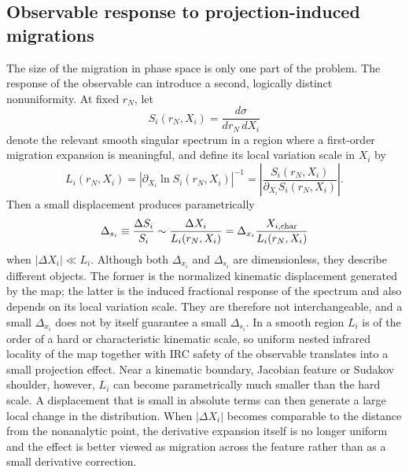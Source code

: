 \documentclass[11pt]{article}
\newcommand{\rn}{r_N}
\begin{document}
\subsection{Observable response to projection-induced migrations}
\label{subsec:observable-response-projection}

The size of the migration in phase space is only one part of the problem. The response of the observable can
introduce a second, logically distinct nonuniformity. At fixed $\rn$, let
\begin{equation}
S_i(\rn,X_i)=\frac{d\sigma}{d\rn\,dX_i}
\label{eq:observable-spectrum-S}
\end{equation}
denote the relevant smooth singular spectrum in a region where a first-order migration expansion is meaningful,
and define its local variation scale in $X_i$ by
\begin{equation}
L_i(\rn,X_i)
=
\left|
\partial_{X_i}\ln S_i(\rn,X_i)
\right|^{-1}
=
\left|
\frac{S_i(\rn,X_i)}{\partial_{X_i}S_i(\rn,X_i)}
\right|.
\label{eq:local-variation-scale}
\end{equation}
Then a small displacement produces parametrically
\begin{equation}
\Delta_{s_i}
\equiv
\frac{\Delta S_i}{S_i}
\sim
\frac{\Delta X_i}{L_i(\rn,X_i)}
=
\Delta_{x_i}
\frac{X_{i,\rm char}}{L_i(\rn,X_i)}
\label{eq:relative-observable-sensitivity}
\end{equation}
when \(|\Delta X_i|\ll L_i\). Although both \(\Delta_{x_i}\) and \(\Delta_{s_i}\) are dimensionless, they
describe different objects. The former is the normalized kinematic displacement generated by the map; the
latter is the induced fractional response of the spectrum and also depends on its local variation scale.
They are therefore not interchangeable, and a small \(\Delta_{x_i}\) does not by itself guarantee a small
\(\Delta_{s_i}\). In a smooth region \(L_i\) is of the order of a hard or characteristic
kinematic scale, so uniform nested infrared locality of the map together with IRC safety of the observable
translates into a small projection effect. Near a kinematic boundary, Jacobian feature or Sudakov shoulder,
however, \(L_i\) can become parametrically much smaller than the hard scale. A displacement that is small in
absolute terms can then generate a large local change in the distribution. When \(|\Delta X_i|\) becomes
comparable to the distance from the nonanalytic point, the derivative expansion itself is no longer uniform
and the effect is better viewed as migration across the feature rather than as a small derivative correction.
\end{document}
